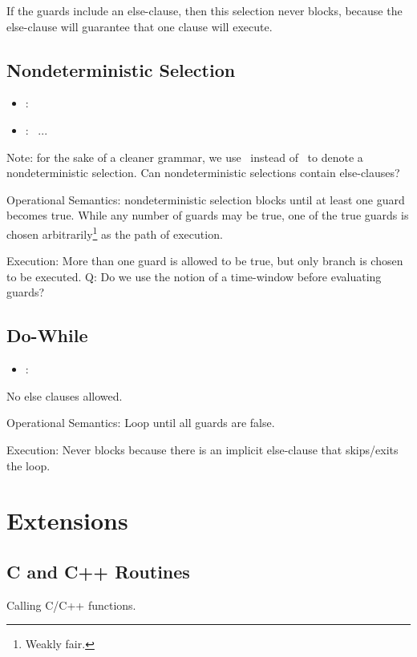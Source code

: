 If the guards include an else-clause, then this selection never blocks, 
because the else-clause will guarantee that one clause will execute.  

\subsection{Nondeterministic Selection}
\label{sec:chp:flow:nondetsel}

\begin{itemize}
\item {} :
	\lbracket\  \rbracket
\item {} :
	 \thinbar\ ...
\end{itemize}

Note: for the sake of a cleaner grammar, 
we use \thinbar\ instead of \oldthinbar\ to denote 
a nondeterministic selection.  
Can nondeterministic selections contain else-clauses?

Operational Semantics: nondeterministic selection blocks until at least
one guard becomes true.  
While any number of guards may be true, one of the true guards is 
chosen arbitrarily\footnote{Weakly fair.} as the path of execution.  

Execution:
More than one guard is allowed to be true, but only branch is chosen
to be executed.  
Q: Do we use the notion of a time-window before evaluating guards?

\subsection{Do-While}
\label{sec:chp:flow:dowhile}

\begin{itemize}
\item {} :
	\chpbeginloop\  \chpendloop
\end{itemize}

No else clauses allowed.  

Operational Semantics:
Loop until all guards are false.  

Execution:
Never blocks because there is an implicit else-clause that
skips/exits the loop.  

\section{Extensions}
\label{sec:chp:ext}

\subsection{C and C++ Routines}
\label{sec:chp:ext:c}

Calling C/C++ functions.  

